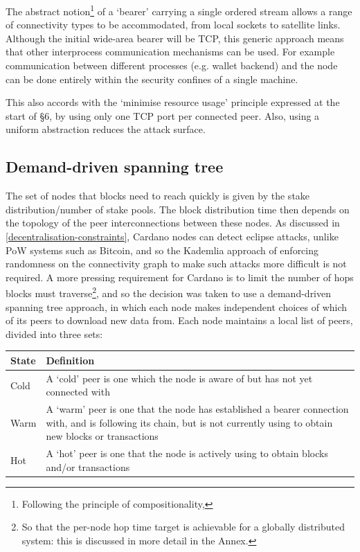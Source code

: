 \documentclass[11pt,a4paper]{article}
\begin{document}
The abstract notion\footnote{Following the principle of
  compositionality,} of a `bearer' carrying a single ordered stream
allows a range of connectivity types to be accommodated, from local
sockets to satellite links. Although the initial wide-area bearer will
be TCP, this generic approach means that other interprocess
communication mechanisms can be used. For example communication between
different processes (e.g. wallet backend) and the node can be done
entirely within the security confines of a single machine.

This also accords with the `minimise resource usage' principle expressed
at the start of §6, by using only one TCP port per connected peer. Also,
using a uniform abstraction reduces the attack surface.

\subsection{Demand-driven spanning tree}
\label{demand-driven-spanning-tree}

The set of nodes that blocks need to reach quickly is given by the stake
distribution/number of stake pools. The block distribution time then
depends on the topology of the peer interconnections between these
nodes. As discussed in
\cref{decentralisation-constraints}, Cardano nodes
can detect eclipse attacks, unlike PoW systems such as Bitcoin, and so
the Kademlia approach of enforcing randomness on the connectivity graph
to make such attacks more difficult is not required. A more pressing
requirement for Cardano is to limit the number of hops blocks must
traverse\footnote{So that the per-node hop time target is achievable for
  a globally distributed system: this is discussed in more detail in the
  Annex.}, and so the decision was taken to use a demand-driven spanning
tree approach, in which each node makes independent choices of which of
its peers to download new data from. Each node maintains a local list of
peers, divided into three sets:

\begin{longtable}[]{@{}ll@{}}
\toprule
\textbf{State} & \textbf{Definition}\tabularnewline
\midrule
\endhead
Cold & A `cold' peer is one which the node is aware of but has not yet
connected with\tabularnewline
Warm & A `warm' peer is one that the node has established a bearer
connection with, and is following its chain, but is not currently using
to obtain new blocks or transactions\tabularnewline
Hot & A `hot' peer is one that the node is actively using to obtain
blocks and/or transactions\tabularnewline
\bottomrule
\end{longtable}
\end{document}
